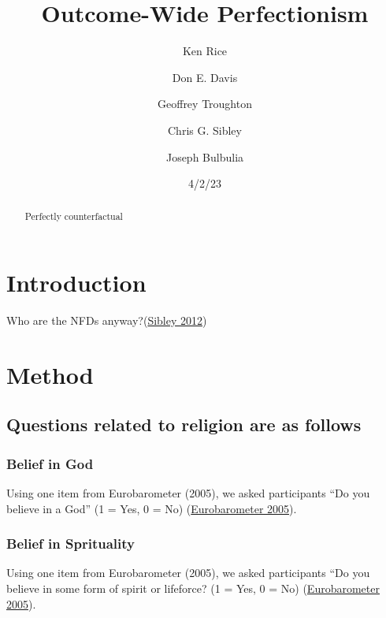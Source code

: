 \documentclass[
  singlecolumn]{report}
\title{Outcome-Wide Perfectionism}
\author{Ken Rice \and Don E. Davis \and Geoffrey Troughton \and Chris G.
Sibley \and Joseph Bulbulia}
\date{4/2/23}
\begin{document}
\maketitle
\begin{abstract}
Perfectly counterfactual
\end{abstract}
\ifdefined\Shaded\renewenvironment{Shaded}{\begin{tcolorbox}[frame hidden, enhanced, boxrule=0pt, sharp corners, borderline west={3pt}{0pt}{shadecolor}, breakable, interior hidden]}{\end{tcolorbox}}\fi

\listoffigures
\listoftables
\hypertarget{introduction}{%
\section{Introduction}\label{introduction}}

Who are the NFDs anyway?(\protect\hyperlink{ref-sibley2012}{Sibley
2012})

\hypertarget{method}{%
\section{Method}\label{method}}

\hypertarget{questions-related-to-religion-are-as-follows}{%
\subsection{Questions related to religion are as
follows}\label{questions-related-to-religion-are-as-follows}}

\hypertarget{belief-in-god}{%
\subsubsection{Belief in God}\label{belief-in-god}}

Using one item from Eurobarometer (2005), we asked participants ``Do you
believe in a God'' (1 = Yes, 0 = No)
(\protect\hyperlink{ref-eurobarometer2005b}{Eurobarometer 2005}).

\hypertarget{belief-in-sprituality}{%
\subsubsection{Belief in Sprituality}\label{belief-in-sprituality}}

Using one item from Eurobarometer (2005), we asked participants ``Do you
believe in some form of spirit or lifeforce? (1 = Yes, 0 = No)
(\protect\hyperlink{ref-eurobarometer2005b}{Eurobarometer 2005}).
\end{document}

